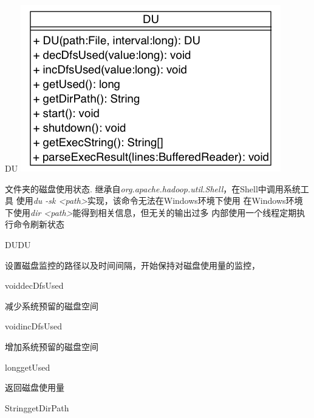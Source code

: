 \begin{XeClass}{DU}
\includegraphics[width=\textwidth]{cdig/DU.png}
     
 文件夹的磁盘使用状态.
 继承自\emph{org.apache.hadoop.util.Shell}，在Shell中调用系统工具
 使用\emph{du -sk <path>}实现，该命令无法在Windows环境下使用
 在Windows环境下使用\emph{dir <path>}能得到相关信息，但无关的输出过多
 内部使用一个线程定期执行命令刷新状态

    \begin{XeMethod}{\XePublic}{DU}{DU}
         
 设置磁盘监控的路径以及时间间隔，开始保持对磁盘使用量的监控，

    \end{XeMethod}

    \begin{XeMethod}{\XePublic}{void}{decDfsUsed}
         
 减少系统预留的磁盘空间

    \end{XeMethod}

    \begin{XeMethod}{\XePublic}{void}{incDfsUsed}
         
 增加系统预留的磁盘空间

    \end{XeMethod}

    \begin{XeMethod}{\XePublic}{long}{getUsed}
         
 返回磁盘使用量

    \end{XeMethod}

    \begin{XeMethod}{\XePublic}{String}{getDirPath}
         

\end{XeMethod}
\end{XeClass}
